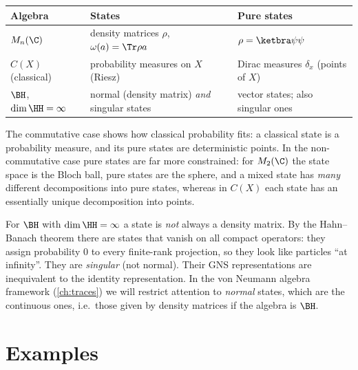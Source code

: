 \begin{center}
\renewcommand{\arraystretch}{1.3}
\begin{tabular}{@{}lll@{}}
\toprule
Algebra & States & Pure states\\
\midrule
$M_n(\C)$ & density matrices $\rho$, $\omega(a)=\Tr\rho a$ & $\rho=\ketbra\psi\psi$\\
$C(X)$ (classical) & probability measures on $X$ (Riesz) & Dirac measures $\delta_x$ (points of $X$)\\
$\BH$, $\dim\HH=\infty$ & normal (density matrix) \emph{and} singular states & vector states; also singular ones\\
\bottomrule
\end{tabular}
\end{center}

The commutative case shows how classical probability fits: a classical state is a probability measure, and its pure states are deterministic points. In the non-commutative case pure states are far more constrained: for $M_2(\C)$ the state space is the Bloch ball, pure states are the sphere, and a mixed state has \emph{many} different decompositions into pure states, whereas in $C(X)$ each state has an essentially unique decomposition into points.

\begin{whatwrong}
For $\BH$ with $\dim\HH=\infty$ a state is \emph{not} always a density matrix. By the Hahn--Banach theorem there are states that vanish on all compact operators: they assign probability $0$ to every finite-rank projection, so they look like particles ``at infinity''. They are \emph{singular} (not normal). Their GNS representations are inequivalent to the identity representation. In the von Neumann algebra framework (\cref{ch:traces}) we will restrict attention to \emph{normal} states, which are the continuous ones, i.e.\ those given by density matrices if the algebra is $\BH$.
\end{whatwrong}

\section{Examples}

